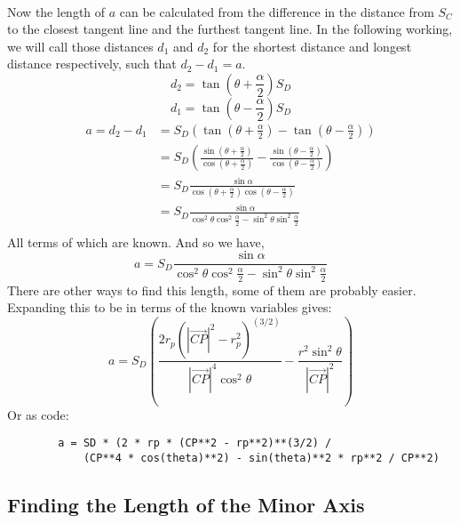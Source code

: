 \documentclass{article}
\newcommand\cpv{\overrightarrow{CP}\xspace}
\begin{document}
	\paragraph{}
	Now the length of $a$ can be calculated from the difference in the distance from $S_C$ to the closest tangent line and the furthest tangent 	line. In the following working, we will call those distances $d_1$ and $d_2$ for the shortest distance and longest distance respectively, 
	such that $d_2 - d_1 = a$.
	$$  d_2 =  \tan{\left(\theta + \frac{\alpha}{2}\right)} S_D $$
	$$  d_1 =  \tan{\left(\theta - \frac{\alpha}{2}\right)} S_D $$
	\begin{align*}
		a = d_2 - d_1 & = S_D \left(\tan{\left(\theta + \frac{\alpha}{2}\right)} - \tan{\left(\theta - \frac{\alpha}{2}\right)} \right) \\
		& = S_D\left(\frac{\sin{\left(\theta + \frac{\alpha}{2}\right)}}{\cos{\left(\theta + \frac{\alpha}{2}\right)}} 
				    - \frac{\sin{\left(\theta - \frac{\alpha}{2}\right)}}{\cos{\left(\theta - \frac{\alpha}{2}\right)}}\right)    \\
		& = S_D \frac{\sin{\alpha}}{\cos{\left(\theta + \frac{\alpha}{2}\right)} \cos{\left(\theta - \frac{\alpha}{2}\right)}} \\
		& = S_D \frac{\sin{\alpha}}{\cos^2{\theta} \cos^2{\frac{\alpha}{2}} - \sin^2{\theta} \sin^2{\frac{\alpha}{2}}} \\
	\end{align*}
	All terms of which are known. And so we have,
	\begin{equation}
		a =  S_D \frac{\sin{\alpha}}{\cos^2{\theta} \cos^2{\frac{\alpha}{2}} - \sin^2{\theta} \sin^2{\frac{\alpha}{2}}}
	\end{equation}
	There are other ways to find this length, some of them are probably easier. Expanding this to be in terms of the known variables gives:
	\begin{equation*}
		a = S_D  \left(\frac{2 r_p \left(\left|\cpv\right|^2-r_p^2\right)^{(3/2)}}{\left|\cpv\right|^4  \cos^2{\theta}}- 	
		\frac{r^2 \sin^2{\theta}}{\left|\cpv\right|^2}\right)
	\end{equation*}
	Or as code:
	\begin{verbatim}
		a = SD * (2 * rp * (CP**2 - rp**2)**(3/2) / 
		    (CP**4 * cos(theta)**2) - sin(theta)**2 * rp**2 / CP**2)
	\end{verbatim}

	\subsection{Finding the Length of the Minor Axis}
\end{document}
